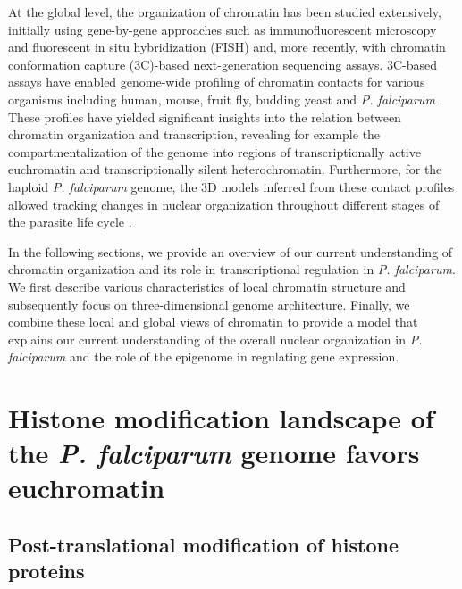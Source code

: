 At the global level, the organization of chromatin has been studied
extensively, initially using gene-by-gene approaches such as immunofluorescent
microscopy and fluorescent in situ hybridization (FISH) and, more recently,
with chromatin conformation capture (3C)-based next-generation sequencing
assays. 3C-based assays have enabled genome-wide profiling of chromatin
contacts for various organisms including human, mouse, fruit fly, budding
yeast and  \textit{P. falciparum} \citep{ay:three-dimensional,
dixon:topological, duan:three-dimensional, lemieux:genome-wide,
lieberman-aiden:comprehensive, sexton:three-dimensional}. These profiles have
yielded significant insights into the relation between chromatin organization
and transcription, revealing for example the compartmentalization of the
genome into regions of transcriptionally active euchromatin and
transcriptionally silent heterochromatin. Furthermore, for the haploid
\textit{P. falciparum} genome, the 3D models inferred from these contact
profiles allowed tracking changes in nuclear organization throughout different
stages of the parasite life cycle \citep{ay:three-dimensional}.

In the following sections, we provide an overview of our current understanding
of chromatin organization and its role in transcriptional regulation in
\textit{P. falciparum}. We first describe various characteristics of local
chromatin structure and subsequently focus on three-dimensional genome
architecture. Finally, we combine these local and global views of chromatin to
provide a model that explains our current understanding of the overall nuclear
organization in \textit{P. falciparum} and the role of the epigenome in
regulating gene expression.

\section{Histone modification landscape of the \textit{P. falciparum} genome favors
euchromatin}

\subsection{Post-translational modification of histone proteins}

